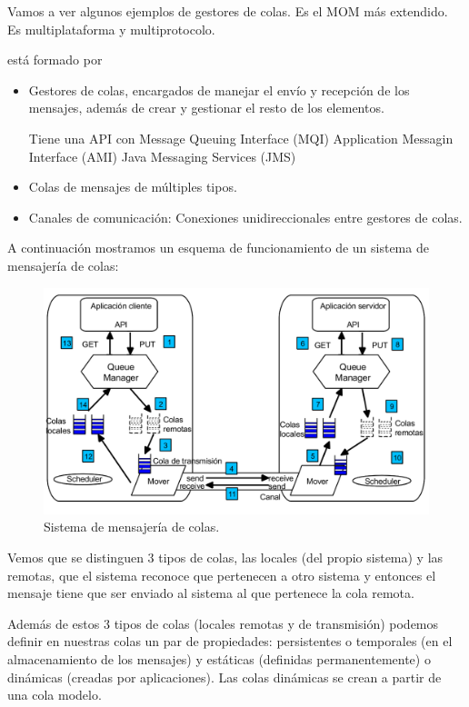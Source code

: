 Vamos a ver algunos ejemplos de gestores de colas.
Es el MOM más extendido. Es multiplataforma y multiprotocolo.


 está formado por
\begin{itemize}
	\item Gestores de colas, encargados de manejar el envío y recepción de los mensajes, además de crear y gestionar el resto de los elementos.

	Tiene una API con
	\subitem Message Queuing Interface (MQI)
	\subitem Application Messagin Interface (AMI)
	\subitem Java Messaging Services (JMS)
	\item Colas de mensajes de múltiples tipos.
	\item Canales de comunicación: Conexiones unidireccionales entre gestores de colas.
\end{itemize}

A continuación mostramos un esquema de funcionamiento de un sistema de mensajería de colas:


\begin{figure}[hbtp]
\centering
\includegraphics[width=1\textwidth]{img/MOMGen.png}
\caption{Sistema de mensajería de colas.}
\label{MOMGen}
\end{figure}
\newpage

Vemos que se distinguen 3 tipos de colas, las locales (del propio sistema) y las remotas, que el sistema reconoce que pertenecen a otro sistema y entonces el mensaje tiene que ser enviado al sistema al que pertenece la cola remota.

Además de estos 3 tipos de colas (locales remotas y de transmisión) podemos definir en nuestras colas un par de propiedades: persistentes o temporales (en el almacenamiento de los mensajes) y estáticas (definidas permanentemente) o dinámicas (creadas por aplicaciones). Las colas dinámicas se crean a partir de una cola modelo.

